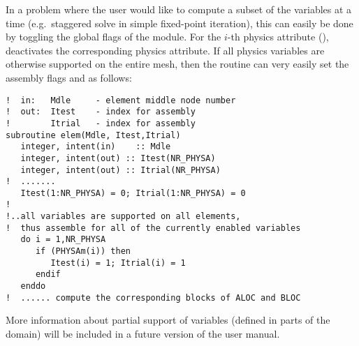 In a problem where the user would like to compute a subset of the variables at a time (e.g.~staggered solve in simple fixed-point iteration), this can easily be done by toggling the global flags  of the  module. For the $i$-th physics attribute (),  deactivates the corresponding physics attribute. If all physics variables are otherwise supported on the entire mesh, then the  routine can very easily set the assembly flags  and  as follows:

\begin{lstlisting}[caption=Solving for a subset of variables in \routine{elem}.]
!  in:   Mdle     - element middle node number
!  out:  Itest    - index for assembly
!        Itrial   - index for assembly
subroutine elem(Mdle, Itest,Itrial)
   integer, intent(in)    :: Mdle
   integer, intent(out) :: Itest(NR_PHYSA)
   integer, intent(out) :: Itrial(NR_PHYSA)
!  .......
   Itest(1:NR_PHYSA) = 0; Itrial(1:NR_PHYSA) = 0
!
!..all variables are supported on all elements,
!  thus assemble for all of the currently enabled variables
   do i = 1,NR_PHYSA
      if (PHYSAm(i)) then
         Itest(i) = 1; Itrial(i) = 1
      endif
   enddo
!  ...... compute the corresponding blocks of ALOC and BLOC
\end{lstlisting}

\begin{remark}
More information about partial support of variables (defined in parts of the domain) will be included in a future version of the user manual.
\end{remark}

%


